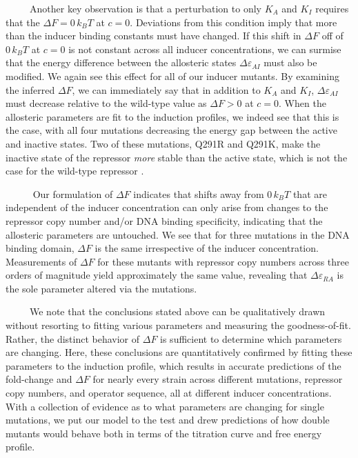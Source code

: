 \documentclass[12pt]{caltech_thesis}
\begin{document}
~~~~~Another key observation is that a perturbation to only \(K_A\) and
\(K_I\) requires that the \(\Delta F = 0\, k_BT\) at \(c = 0\).
Deviations from this condition imply that more than the inducer binding
constants must have changed. If this shift in \(\Delta F\) off of
\(0\, k_BT\) at \(c = 0\) is not constant across all inducer
concentrations, we can surmise that the energy difference between the
allosteric states \(\Delta\varepsilon_{AI}\) must also be modified. We
again see this effect for all of our inducer mutants. By examining the
inferred \(\Delta F\), we can immediately say that in addition to
\(K_A\) and \(K_I\), \(\Delta\varepsilon_{AI}\) must decrease relative
to the wild-type value as \(\Delta F > 0\) at \(c = 0\). When the
allosteric parameters are fit to the induction profiles, we indeed see
that this is the case, with all four mutations decreasing the energy gap
between the active and inactive states. Two of these mutations, Q291R
and Q291K, make the inactive state of the repressor \emph{more} stable
than the active state, which is not the case for the wild-type repressor
\autocite{razo-mejia2018}.

~~~~~ Our formulation of \(\Delta F\) indicates that shifts away from
\(0\, k_BT\) that are independent of the inducer concentration can only
arise from changes to the repressor copy number and/or DNA binding
specificity, indicating that the allosteric parameters are untouched. We
see that for three mutations in the DNA binding domain, \(\Delta F\) is
the same irrespective of the inducer concentration. Measurements of
\(\Delta F\) for these mutants with repressor copy numbers across three
orders of magnitude yield approximately the same value, revealing that
\(\Delta\varepsilon_{RA}\) is the sole parameter altered via the
mutations.

~~~~~We note that the conclusions stated above can be qualitatively
drawn without resorting to fitting various parameters and measuring the
goodness-of-fit. Rather, the distinct behavior of \(\Delta F\) is
sufficient to determine which parameters are changing. Here, these
conclusions are quantitatively confirmed by fitting these parameters to
the induction profile, which results in accurate predictions of the
fold-change and \(\Delta F\) for nearly every strain across different
mutations, repressor copy numbers, and operator sequence, all at
different inducer concentrations. With a collection of evidence as to
what parameters are changing for single mutations, we put our model to
the test and drew predictions of how double mutants would behave both in
terms of the titration curve and free energy profile.
\end{document}
